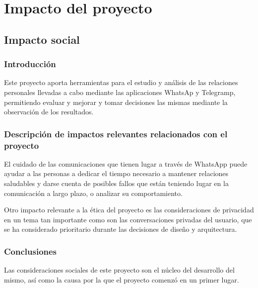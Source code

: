 \chapter{Impacto del proyecto} \label{chap:impact}

\section{Impacto social} \label{sec:social_impact}

\subsection{Introducción}

Este proyecto aporta herramientas para el estudio y análisis de las relaciones personales llevadas a cabo mediante las aplicaciones WhatsAp y Telegramp, permitiendo evaluar y mejorar y tomar decisiones las mismas mediante la observación de los resultados.

\subsection{Descripción de impactos relevantes relacionados con el proyecto}

El cuidado de las comunicaciones que tienen lugar a través de WhatsApp puede ayudar a las personas a dedicar el tiempo necesario a mantener relaciones saludables y darse cuenta de posibles fallos que están teniendo lugar en la comunicación a largo plazo, o analizar su comportamiento.

Otro impacto relevante a la ética del proyecto es las consideraciones de privacidad en un tema tan importante como son las conversaciones privadas del usuario, que se ha considerado prioritario durante las decisiones de diseño y arquitectura.

\subsection{Conclusiones}

Las consideraciones sociales de este proyecto son el núcleo del desarrollo del mismo, así como la causa por la que el proyecto comenzó en un primer lugar.